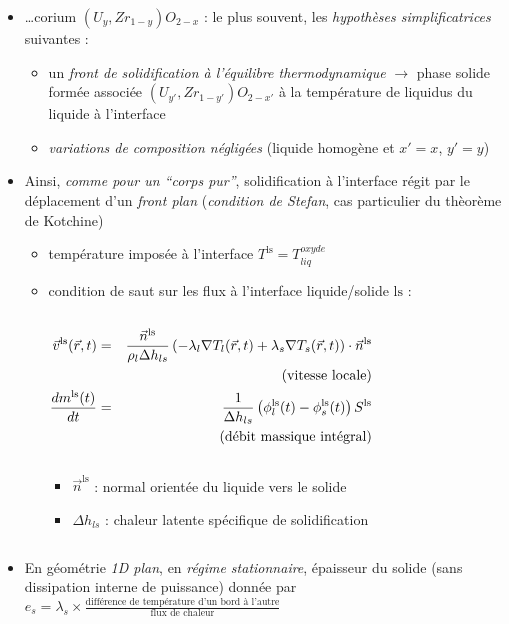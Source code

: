 \begin{frame}[fragile]
\begin{itemize}
\item \dots corium $\left(U_y,Zr_{1-y}\right)O_{2-x}$ : le plus souvent, les \emph{hypothèses simplificatrices} suivantes :
\begin{itemize}
  \item un \emph{front de solidification à l'équilibre thermodynamique} $\rightarrow$ phase solide formée associée $\left(U_{y'},Zr_{1-y'}\right)O_{2-x'}$ à la température de liquidus du liquide à l'interface 
  \item \emph{variations de composition négligées} (liquide homogène et $x'=x$, $y'=y$)
\end{itemize}
\item Ainsi, \emph{comme pour un ``corps pur''}, solidification à l'interface régit par le déplacement d'un \emph{front plan} (\emph{condition de Stefan}, cas particulier du thèorème de Kotchine)
\begin{itemize}
  \item température imposée à l'interface $T^{\textrm{ls}}=T_{liq}^{oxyde}$
  \item condition de saut sur les flux à l'interface liquide/solide $\textrm{ls}$ : 
\begin{columns}
\begin{scriptsize}
\begin{column}{0.55\textwidth}
\begin{eqnarray*}
  \vec{v}^{\textrm{ls}}(\vec{r}, t) &=& \frac{\vec{n}^{\textrm{ls}}}{\rho_l \Delta h_{ls}} \left(-\lambda_l \nabla T_l(\vec{r}, t) + \lambda_s \nabla T_s(\vec{r}, t) \right) \cdot \vec{n}^{\textrm{ls}} \\
  &&\text{(vitesse locale)}\\
  \frac{dm^{\textrm{ls}}(t)}{dt} &=& \frac{1}{\Delta h_{ls}} \left(\phi_l^{\textrm{ls}}(t) - \phi_s^{\textrm{ls}}(t)\right) S^{\textrm{ls}} \\
  && \text{(débit massique intégral)}
\end{eqnarray*}
\end{column}
\begin{column}{0.45\textwidth}
\begin{itemize}
\item $\vec{n}^{\textrm{ls}}$ : normal orientée du liquide vers le solide
\item $\Delta h_{ls}$ : chaleur latente spécifique de solidification
\end{itemize}
\end{column}
\end{scriptsize}
\end{columns}
\end{itemize}
\item En géométrie \emph{1D plan}, en  \emph{régime stationnaire}, épaisseur du solide (sans dissipation interne de puissance) donnée par \emph{$e_{s} = \lambda_{s}\times \frac{\text{différence de température d'un bord à l'autre}}{\text{flux de chaleur}}$}
\end{itemize}
\end{frame}
